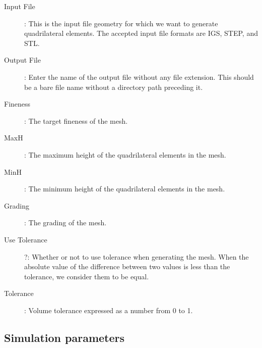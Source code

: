 \documentclass[12pt]{article}
\begin{document}
\begin{description}
	\item [Input File]: This is the input file geometry for which we want to generate quadrilateral elements. The accepted input file formats are IGS, STEP, and STL.
\item [Output File]: Enter the name of the output file without any file extension. This should be a bare file name without a directory path preceding it.
\item [Fineness]: The target fineness of the mesh.
\item [MaxH]: The maximum height of the quadrilateral elements in the mesh. 
\item [MinH]: The minimum height of the quadrilateral elements in the mesh. 
\item [Grading]: The grading of the mesh.
\item [Use Tolerance]?: Whether or not to use tolerance when generating the mesh. When the absolute value of the difference between two values is less than the tolerance, we consider them to be equal.
\item [Tolerance]: Volume tolerance expressed as a number from 0 to 1.
\end{description}


\subsection{Simulation parameters}
\end{document}
